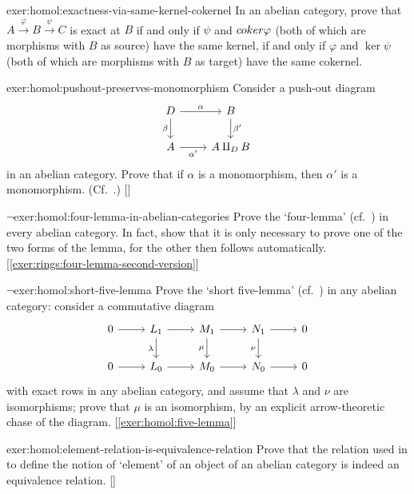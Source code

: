 \begin{exer}{}{exer:homol:exactness-via-same-kernel-cokernel}
  In an abelian category, prove that
  $A \xrightarrow{\varphi} B \xrightarrow{\psi} C$ is exact at $B$ if
  and only if $\psi$ and $coker\varphi$ (both of which are morphisms
  with $B$ as source) have the same kernel, if and only if $\varphi$
  and $\ker\psi$ (both of which are morphisms with $B$ as target) have
  the same cokernel.
\end{exer}
\begin{exer}{}{exer:homol:pushout-preserves-monomorphism}
  \exerused{} Consider a push-out diagram
  \[\begin{tikzcd}
      D \arrow[r, "\alpha"] \arrow[d, "\beta"'] & B \arrow[d, "\beta'"] \\
      A \arrow[r, "\alpha'"'] & A \amalg_D B
    \end{tikzcd}\] in an abelian category. Prove that if $\alpha$ is a
  monomorphism, then $\alpha'$ is a monomorphism. (Cf.\
  .)
  []
\end{exer}
\begin{exer}{$\lnot$}{exer:homol:four-lemma-in-abelian-categories}
  Prove the `four-lemma' (cf.\
  )
  in
  every abelian category. In fact, show that it is only necessary to
  prove one of the two forms of the lemma, for the other then follows
  automatically. [\ref{exer:rings:four-lemma-second-version}]
\end{exer}
\begin{exer}{$\lnot$}{exer:homol:short-five-lemma}
  Prove the `short five-lemma' (cf.\
  ) in any abelian
  category: consider a commutative diagram
  \[\begin{tikzcd}
      0 \arrow[r] & L_1 \arrow[r] \arrow[d, "\lambda"'] & M_1
      \arrow[r] \arrow[d, "\mu"'] &
      N_1 \arrow[r] \arrow[d, "\nu"'] & 0 \\
      0 \arrow[r] & L_0 \arrow[r] & M_0 \arrow[r] & N_0 \arrow[r] & 0
    \end{tikzcd}\] with exact rows in any abelian category, and assume
  that $\lambda$ and $\nu$ are isomorphisms; prove that $\mu$ is an
  isomorphism, by an explicit arrow-theoretic chase of the
  diagram. [\ref{exer:homol:five-lemma}]
\end{exer}
\begin{exer}{}{exer:homol:element-relation-is-equivalence-relation}
  \exerused{} Prove that the relation used in
  to define the notion of `element' of an object of an abelian
  category is indeed an equivalence
  relation. []
\end{exer}
